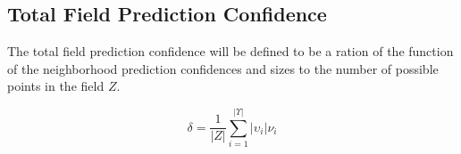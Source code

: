\subsection{Total Field Prediction Confidence}
The total field prediction confidence will be defined to be a ration of the function of the neighborhood prediction confidences and sizes to the number of possible points in the field $Z$.

\begin{equation}
\delta = \frac{1}{|Z|} \sum_{i = 1}^{|\Upsilon|} |\upsilon_i| \nu_i
\end{equation}

